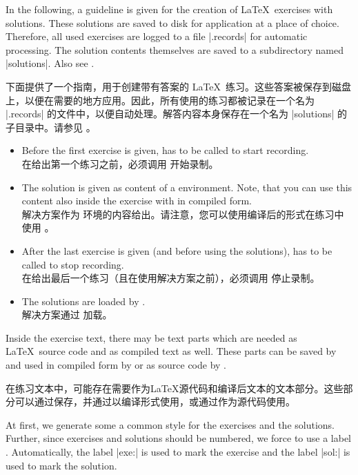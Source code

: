 In the following, a guideline is given for the creation of \LaTeX\ exercises
with solutions. These solutions are saved to disk for application at a place of
choice.
Therefore, all used exercises are logged to a file |\jobname.records| for automatic
processing. The solution contents themselves are saved to a subdirectory named
|solutions|. Also see .

下面提供了一个指南，用于创建带有答案的 \LaTeX\ 练习。这些答案被保存到磁盘上，以便在需要的地方应用。因此，所有使用的练习都被记录在一个名为 |\jobname.records| 的文件中，以便自动处理。解答内容本身保存在一个名为 |solutions| 的子目录中。请参见 。
\begin{itemize}
\item Before the first exercise is given,
 has to be called to start recording.
\\在给出第一个练习之前，必须调用  开始录制。
\item The solution is given as content of a 
environment. Note, that you can use this content also inside the
exercise with  in compiled form.
\\解决方案作为  环境的内容给出。请注意，您可以使用编译后的形式在练习中使用 。
\item After the last exercise is given (and before using the solutions),
 has to be called to stop recording.
\\在给出最后一个练习（且在使用解决方案之前），必须调用  停止录制。
\item The solutions are loaded by .
\\解决方案通过  加载。
\end{itemize}

Inside the exercise text, there may be text parts which are needed as
\LaTeX\ source code and as compiled text as well. These parts can be
saved by  and used in compiled form by 
or as source code by .

在练习文本中，可能存在需要作为\LaTeX 源代码和编译后文本的文本部分。这些部分可以通过保存，并通过以编译形式使用，或通过作为源代码使用。

At first, we generate some a common style for the exercises and the
solutions. Further, since exercises and solutions should
be numbered, we force to use a label .
Automatically, the label |exe:| is used to mark the exercise
and the label |sol:| is used to mark the solution.

